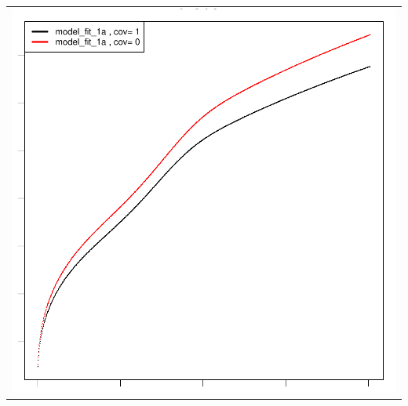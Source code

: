 \documentclass[11pt,a4paper]{article}
\begin{document}
\begin{enumerate}
\begin{minipage}{0.45\textwidth}
\begin{tabular}{|p{\textwidth}}
\includegraphics{SemiMarkov_Paper-012}
\end{tabular}
\end{minipage}%
\end{enumerate}
\end{document}
